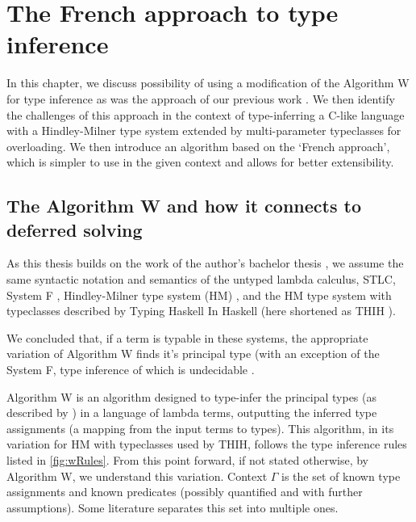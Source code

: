 \chapter{The French approach to type inference}

\label{chap1}

In this chapter, we discuss possibility of using a modification of the Algorithm W \cite{damas1982principal} for type inference as was the approach of our previous work \cite{klepl2020type}. We then identify the challenges of this approach in the context of type-inferring a C-like language with a Hindley-Milner \cite{damas1982principal} type system extended by multi-parameter typeclasses for overloading. We then introduce an algorithm based on the `French approach', which is simpler to use in the given context and allows for better extensibility.

\section{The Algorithm W and how it connects to deferred solving}

As this thesis builds on the work of the author's bachelor thesis \cite{klepl2020type}, we assume the same syntactic notation and semantics of the untyped lambda calculus, STLC, System F \cite{barendregt1992lambda}, Hindley-Milner type system (HM) \cite{damas1982principal}, and the HM type system with typeclasses described by Typing Haskell In Haskell (here shortened as THIH \cite{jones1999typing}).

We concluded that, if a term is typable in these systems, the appropriate variation of Algorithm W finds it's principal type (with an exception of the System F, type inference of which is undecidable \cite{wells1999typability}.

Algorithm W is an algorithm designed to type-infer the principal types (as described by \citet{damas1982principal}) in a language of lambda terms, outputting the inferred type assignments (a mapping from the input terms to types). This algorithm, in its variation for HM with typeclasses used by THIH, follows the type inference rules listed in \cref{fig:wRules}. From this point forward, if not stated otherwise, by Algorithm W, we understand this variation. Context $\Gamma$ is the set of known type assignments and known predicates (possibly quantified and with further assumptions). Some literature separates this set into multiple ones.

